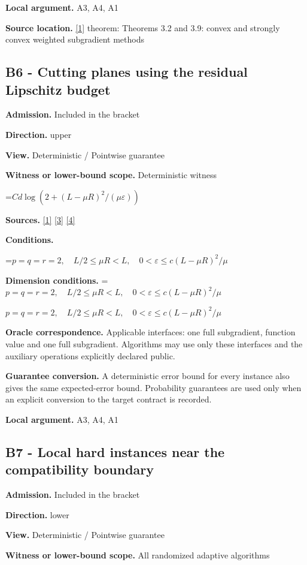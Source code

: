 \documentclass[10pt,a4paper]{article}
\newcommand{\AtlasMath}[1]{\par\begingroup\centering\setbox0=\hbox{$\displaystyle #1$}\ifdim\wd0>1.4\linewidth\typeout{ATLAS WIDE FORMULA: \the\wd0}\fi\ifdim\wd0>\linewidth\resizebox{\linewidth}{!}{\box0}\else\box0\fi\par\endgroup}
\newcommand{\AtlasInlineMath}[1]{\begingroup\setbox0=\hbox{$#1$}\ifdim\wd0>.4\linewidth\endgroup\AtlasMath{#1}\else\endgroup$#1$\fi}
\begin{document}
\textbf{Local argument.} A3, A4, A1

\textbf{Source location.} \href{https://arxiv.org/pdf/1405.4980}{[1]} theorem: Theorems 3.2 and 3.9: convex and strongly convex weighted subgradient methods

\subsection{B6 - Cutting planes using the residual Lipschitz budget}
\textbf{Admission.} Included in the bracket

\textbf{Direction.} upper

\textbf{View.} Deterministic / Pointwise guarantee

\textbf{Witness or lower-bound scope.} Deterministic witness

\AtlasMath{Cd\log(2+(L-\mu R)^2/(\mu\varepsilon))}
\textbf{Sources.} \href{https://arxiv.org/pdf/1405.4980}{[1]} \href{https://www2.isye.gatech.edu/~nemirovs/MOR_AccuracyCertificates.pdf}{[3]} \href{https://arxiv.org/pdf/2609.20701}{[4]}

\textbf{Conditions.} 
\AtlasMath{p=q=r=2,\quad L/2\le\mu R<L,\quad0<\varepsilon\le c(L-\mu R)^2/\mu}


\textbf{Dimension conditions.} \AtlasInlineMath{p=q=r=2,\quad L/2\le\mu R<L,\quad0<\varepsilon\le c(L-\mu R)^2/\mu}

\textbf{Oracle correspondence.} Applicable interfaces: one full subgradient, function value and one full subgradient. Algorithms may use only these interfaces and the auxiliary operations explicitly declared public.

\textbf{Guarantee conversion.} A deterministic error bound for every instance also gives the same expected-error bound. Probability guarantees are used only when an explicit conversion to the target contract is recorded.

\textbf{Local argument.} A3, A4, A1

\subsection{B7 - Local hard instances near the compatibility boundary}
\textbf{Admission.} Included in the bracket

\textbf{Direction.} lower

\textbf{View.} Deterministic / Pointwise guarantee

\textbf{Witness or lower-bound scope.} All randomized adaptive algorithms
\end{document}
